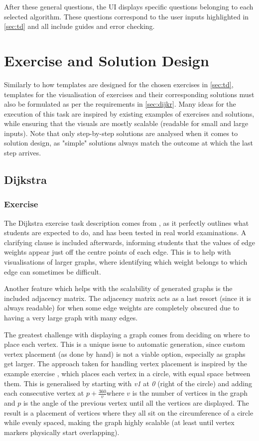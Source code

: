 \documentclass{l4proj}
\begin{document}
After these general questions, the UI displays specific questions belonging to each selected algorithm. These questions correspond to the user inputs highlighted in \autoref{sec:td} and all include guides and error checking.

\section{Exercise and Solution Design}

\cite{a}

Similarly to how templates are designed for the chosen exercises in \autoref{sec:td}, templates for the visualisation of exercises and their corresponding solutions must also be formulated as per the requirements in \autoref{sec:dijkr}. Many ideas for the execution of this task are inspired by existing examples of exercises and solutions, while ensuring that the visuals are mostly scalable (readable for small and large inputs). Note that only step-by-step solutions are analysed when it comes to solution design, as "simple" solutions always match the outcome at which the last step arrives.

\subsection{Dijkstra}
\subsubsection{Exercise}

The Dijkstra exercise task description comes from \cite{a}, as it perfectly outlines what students are expected to do, and has been tested in real world examinations. A clarifying clause is included afterwards, informing students that the values of edge weights appear just off the centre points of each edge. This is to help with visualisations of larger graphs, where identifying which weight belongs to which edge can sometimes be difficult.

Another feature which helps with the scalability of generated graphs is the included adjacency matrix. The adjacency matrix acts as a last resort (since it is always readable) for when some edge weights are completely obscured due to having a very large graph with many edges. 

The greatest challenge with displaying a graph comes from deciding on where to place each vertex. This is a unique issue to automatic generation, since custom vertex placement (as done by hand) is not a viable option, especially as graphs get larger. The approach taken for handling vertex placement is inspired by the example exercise \cite{a}, which places each vertex in a circle, with equal space between them. This is generalised by starting with \emph{v1} at \emph{0 \textdegree} (right of the circle) and adding each consecutive vertex at $p+\frac{360 }{v}$\textdegree where $v$ is the number of vertices in the graph and $p$ is the angle of the previous vertex until all the vertices are displayed. The result is a placement of vertices where they all sit on the circumference of a circle while evenly spaced, making the graph highly scalable (at least until vertex markers physically start overlapping).
\end{document}

